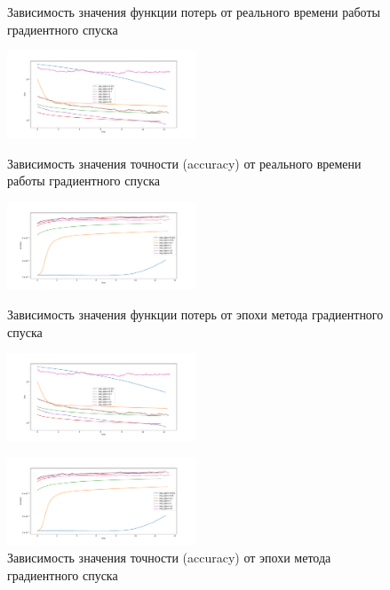 \documentclass[a4paper, 11pt]{article}
\begin{document}
            \begin{figure}[H] \label{exp1}
                \begin{multicols}{2}
                    \begin{center}
                        \caption{Зависимость значения функции потерь от реального времени работы градиентного спуска} \label{exp4:sgd_func_time}
                        \includegraphics[width=0.5\textwidth, height=0.25\textheight]{../graphs/exp1_func_GD_alpha_time_beta=0,001.pdf}
                        
                        \caption{Зависимость значения точности (accuracy) от реального времени работы градиентного спуска} \label{exp4:sgd_acc_time}
                        \includegraphics[width=0.5\textwidth, height=0.25\textheight]{../graphs/exp1_accuracy_GD_alpha_time_beta=0,001.pdf}
                        
                        \caption{Зависимость значения функции потерь от эпохи метода градиентного спуска} \label{exp4:sgd_func_iter}
                        \includegraphics[width=0.5\textwidth, height=0.25\textheight]{../graphs/exp1_func_GD_alpha_time_beta=0,001.pdf}
                        
                        \caption{Зависимость значения точности (accuracy) от эпохи метода градиентного спуска} \label{exp4:sgd_acc_iter}
                        \includegraphics[width=0.5\textwidth, height=0.25\textheight]{../graphs/exp1_accuracy_GD_alpha_time_beta=0,001.pdf}
                    \end{center}
                \end{multicols}
            \end{figure}
        
\end{document}
